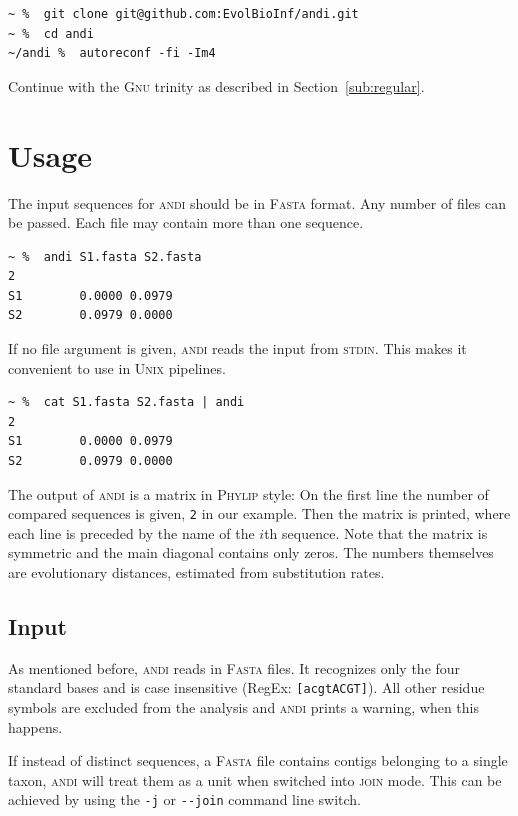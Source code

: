 \documentclass[a4paper,
  10pt,
  english,
  DIV=12,
  BCOR=8mm]{scrbook}
\newcommand{\algo}[1]{\textsc{{#1}}}
\newcommand{\andi}{\algo{andi}\xspace}
\begin{document}
\begin{lstlisting}
~ %  git clone git@github.com:EvolBioInf/andi.git
~ %  cd andi
~/andi %  autoreconf -fi -Im4
\end{lstlisting}

\noindent Continue with the \algo{Gnu} trinity as described in Section~\ref{sub:regular}.


\chapter{Usage} %

The input sequences for \andi should be in \algo{Fasta} format. Any number of files can be passed. Each file may contain more than one sequence.

\begin{lstlisting}
~ %  andi S1.fasta S2.fasta
2
S1        0.0000 0.0979
S2        0.0979 0.0000
\end{lstlisting}

If no file argument is given, \andi reads the input from \algo{stdin}. This makes it convenient to use in \algo{Unix} pipelines.

\begin{lstlisting}
~ %  cat S1.fasta S2.fasta | andi
2
S1        0.0000 0.0979
S2        0.0979 0.0000
\end{lstlisting}

The output of \andi is a matrix in \algo{Phylip} style: On the first line the number of compared sequences is given, \lstinline!2! in our example. Then the matrix is printed, where each line is preceded by the name of the $i$th sequence. Note that the matrix is symmetric and the main diagonal contains only zeros. The numbers themselves are evolutionary distances, estimated from substitution rates.


\section{Input} \label{sec:join}

As mentioned before, \andi reads in \algo{Fasta} files. It recognizes only the four standard bases and is case insensitive (RegEx: \lstinline![acgtACGT]!). All other residue symbols are excluded from the analysis and \andi prints a warning, when this happens.

If instead of distinct sequences, a \algo{Fasta} file contains contigs belonging to a single taxon, \andi will treat them as a unit when switched into \algo{join} mode. This can be achieved by using the \lstinline!-j! or \lstinline!--join! command line switch.
\end{document}

